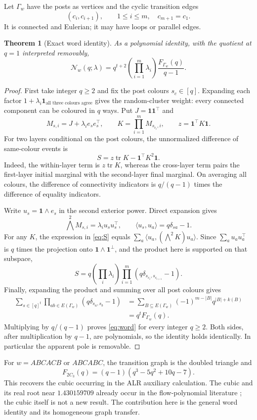 \documentclass[11pt,a4paper]{article}
\newtheorem{theorem}{Theorem}[section]
\theoremstyle{remark}\newtheorem{remark}[theorem]{Remark}
\DeclareMathOperator{\tr}{tr}\DeclareMathOperator{\diag}{diag}
\newcommand{\one}{\mathbf 1}\newcommand{\N}{\mathcal N}
\begin{document}
Let $\Gamma_w$ have the posts as vertices and the cyclic transition edges
\[
(c_i,c_{i+1}),\qquad 1\le i\le m,\quad c_{m+1}=c_1.
\]
It is connected and Eulerian; it may have loops or parallel edges.
\begin{theorem}[Exact word identity]\label{thm:word}
As a polynomial identity, with the quotient at $q=1$ interpreted removably,
\begin{equation}\label{eq:word}
\boxed{\displaystyle
\N_w(q;\lambda)=q^{t+2}\left(\prod_{i=1}^m\lambda_i\right)
\frac{F_{\Gamma_w}(q)}{q-1}.}
\end{equation}
\end{theorem}
\begin{proof}
First take integer $q\ge2$ and fix the post colours $s_c\in[q]$. Expanding each factor $1+\lambda_i\one_{\text{all three colours agree}}$ gives the random-cluster weight: every connected component can be coloured in $q$ ways. Put $J=\one\one^\top$ and
\[
M_{s,i}=J+\lambda_i e_se_s^\top,\qquad
K=\prod_{i=1}^m M_{s_{c_i},i},\qquad z=\one^\top K\one.
\]
For two layers conditional on the post colours, the unnormalized difference of same-colour events is
\begin{equation}\label{eq:S}
S=z\tr K-\one^\top K^2\one.
\end{equation}
Indeed, the within-layer term is $z\tr K$, whereas the cross-layer term pairs the first-layer initial marginal with the second-layer final marginal. On averaging all colours, the difference of connectivity indicators is $q/(q-1)$ times the difference of equality indicators.

Write $u_s=\one\wedge e_s$ in the second exterior power. Direct expansion gives
\[
\bigwedge^2 M_{s,i}=\lambda_i u_su_s^\top,
\qquad \langle u_s,u_a\rangle=q\delta_{sa}-1.
\]
For any $K$, the expression in \eqref{eq:S} equals
$\sum_a\langle u_a,(\bigwedge^2K)u_a\rangle$. Since
$\sum_a u_au_a^\top$ is $q$ times the projection onto
$\one\wedge\one^\perp$, and the product here is supported on that subspace,
\[
S=q\left(\prod_i\lambda_i\right)
\prod_{i=1}^m(q\delta_{s_{c_i},s_{c_{i+1}}}-1).
\]
Finally, expanding the product and summing over all post colours gives
\begin{align*}
\sum_{s\in[q]^t}\prod_{ab\in E(\Gamma_w)}(q\delta_{s_a,s_b}-1)
&=\sum_{B\subseteq E(\Gamma_w)}(-1)^{m-|B|}q^{|B|+k(B)}\\
&=q^tF_{\Gamma_w}(q).
\end{align*}
Multiplying by $q/(q-1)$ proves \eqref{eq:word} for every integer $q\ge2$. Both sides, after multiplication by $q-1$, are polynomials, so the identity holds identically. In particular the apparent pole is removable.
\end{proof}
For $w=ABCACB$ or $ABCABC$, the transition graph is the doubled triangle and
\[
F_{2C_3}(q)=(q-1)(q^3-5q^2+10q-7).
\]
This recovers the cubic occurring in the ALR auxiliary calculation. The cubic and its real root near $1.430159709$ already occur in the flow-polynomial literature \cite{Dong}; the cubic itself is not a new result. The contribution here is the general word identity and its homogeneous graph transfer.
\end{document}
